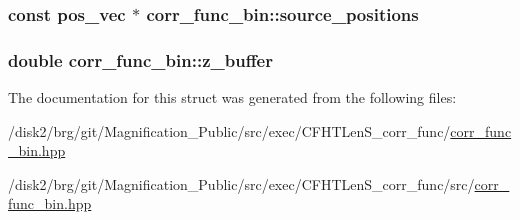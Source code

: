 \hypertarget{structcorr__func__bin_aca9a4da34951ee169664eb0be68d0d61}{
\subsubsection[{source\-\_\-positions}]{\setlength{\rightskip}{0pt plus 5cm}const {\bf pos\-\_\-vec} $\ast$ corr\-\_\-func\-\_\-bin\-::source\-\_\-positions}}\label{structcorr__func__bin_aca9a4da34951ee169664eb0be68d0d61}
\hypertarget{structcorr__func__bin_a84d10388283c2977e9338534303e355b}{
\subsubsection[{z\-\_\-buffer}]{\setlength{\rightskip}{0pt plus 5cm}double corr\-\_\-func\-\_\-bin\-::z\-\_\-buffer}}\label{structcorr__func__bin_a84d10388283c2977e9338534303e355b}


The documentation for this struct was generated from the following files\-:\begin{DoxyCompactItemize}
\item 
/disk2/brg/git/\-Magnification\-\_\-\-Public/src/exec/\-C\-F\-H\-T\-Len\-S\-\_\-corr\-\_\-func/\hyperlink{corr__func__bin_8hpp}{corr\-\_\-func\-\_\-bin.\-hpp}\item 
/disk2/brg/git/\-Magnification\-\_\-\-Public/src/exec/\-C\-F\-H\-T\-Len\-S\-\_\-corr\-\_\-func/src/\hyperlink{src_2corr__func__bin_8hpp}{corr\-\_\-func\-\_\-bin.\-hpp}\end{DoxyCompactItemize}
